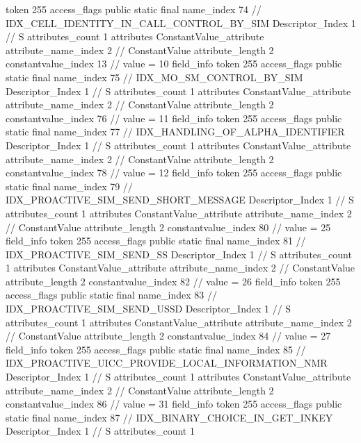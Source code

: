 {{{{{				token	255
				access_flags	public static final
				name_index	74		// IDX_CELL_IDENTITY_IN_CALL_CONTROL_BY_SIM
				Descriptor_Index	1		// S
				attributes_count	1
				attributes {
				ConstantValue_attribute {
					attribute_name_index	2		// ConstantValue
					attribute_length	2
					constantvalue_index	13		// value = 10
				}
				}
			}
			field_info {
				token	255
				access_flags	public static final
				name_index	75		// IDX_MO_SM_CONTROL_BY_SIM
				Descriptor_Index	1		// S
				attributes_count	1
				attributes {
				ConstantValue_attribute {
					attribute_name_index	2		// ConstantValue
					attribute_length	2
					constantvalue_index	76		// value = 11
				}
				}
			}
			field_info {
				token	255
				access_flags	public static final
				name_index	77		// IDX_HANDLING_OF_ALPHA_IDENTIFIER
				Descriptor_Index	1		// S
				attributes_count	1
				attributes {
				ConstantValue_attribute {
					attribute_name_index	2		// ConstantValue
					attribute_length	2
					constantvalue_index	78		// value = 12
				}
				}
			}
			field_info {
				token	255
				access_flags	public static final
				name_index	79		// IDX_PROACTIVE_SIM_SEND_SHORT_MESSAGE
				Descriptor_Index	1		// S
				attributes_count	1
				attributes {
				ConstantValue_attribute {
					attribute_name_index	2		// ConstantValue
					attribute_length	2
					constantvalue_index	80		// value = 25
				}
				}
			}
			field_info {
				token	255
				access_flags	public static final
				name_index	81		// IDX_PROACTIVE_SIM_SEND_SS
				Descriptor_Index	1		// S
				attributes_count	1
				attributes {
				ConstantValue_attribute {
					attribute_name_index	2		// ConstantValue
					attribute_length	2
					constantvalue_index	82		// value = 26
				}
				}
			}
			field_info {
				token	255
				access_flags	public static final
				name_index	83		// IDX_PROACTIVE_SIM_SEND_USSD
				Descriptor_Index	1		// S
				attributes_count	1
				attributes {
				ConstantValue_attribute {
					attribute_name_index	2		// ConstantValue
					attribute_length	2
					constantvalue_index	84		// value = 27
				}
				}
			}
			field_info {
				token	255
				access_flags	public static final
				name_index	85		// IDX_PROACTIVE_UICC_PROVIDE_LOCAL_INFORMATION_NMR
				Descriptor_Index	1		// S
				attributes_count	1
				attributes {
				ConstantValue_attribute {
					attribute_name_index	2		// ConstantValue
					attribute_length	2
					constantvalue_index	86		// value = 31
				}
				}
			}
			field_info {
				token	255
				access_flags	public static final
				name_index	87		// IDX_BINARY_CHOICE_IN_GET_INKEY
				Descriptor_Index	1		// S
				attributes_count	1
}}}}}
